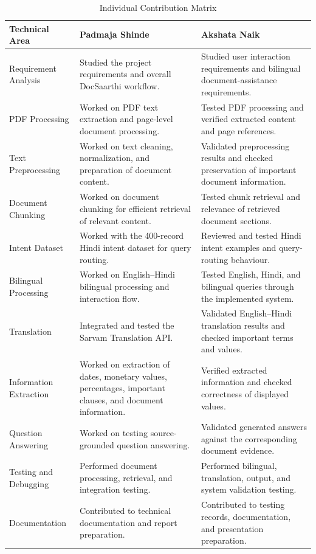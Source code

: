 \begin{table}[H]
\centering
\caption{Individual Contribution Matrix}
\label{tab:individual_contribution}

\small
\renewcommand{\arraystretch}{1.05}
\setlength{\tabcolsep}{4pt}

\begin{tabular}{|
>{\raggedright\arraybackslash}p{3.2cm}|
>{\raggedright\arraybackslash}p{5.1cm}|
>{\raggedright\arraybackslash}p{5.1cm}|}

\hline
\textbf{Technical Area} &
\textbf{Padmaja Shinde} &
\textbf{Akshata Naik}
\\
\hline
Requirement Analysis &
Studied the project requirements and overall
DocSaarthi workflow. &
Studied user interaction requirements and
bilingual document-assistance requirements.
\\
\hline
PDF Processing &
Worked on PDF text extraction and page-level
document processing. &
Tested PDF processing and verified extracted
content and page references.
\\
\hline
Text Preprocessing &
Worked on text cleaning, normalization, and
preparation of document content. &
Validated preprocessing results and checked
preservation of important document information.
\\
\hline
Document Chunking &
Worked on document chunking for efficient
retrieval of relevant content. &
Tested chunk retrieval and relevance of
retrieved document sections.
\\
\hline
Intent Dataset &
Worked with the 400-record Hindi intent dataset
for query routing. &
Reviewed and tested Hindi intent examples and
query-routing behaviour.
\\
\hline
Bilingual Processing &
Worked on English--Hindi bilingual processing
and interaction flow. &
Tested English, Hindi, and bilingual queries
through the implemented system.
\\
\hline
Translation &
Integrated and tested the Sarvam Translation API. &
Validated English--Hindi translation results and
checked important terms and values.
\\
\hline
Information Extraction &
Worked on extraction of dates, monetary values,
percentages, important clauses, and document
information. &
Verified extracted information and checked
correctness of displayed values.
\\
\hline
Question Answering &
Worked on testing source-grounded question
answering. &
Validated generated answers against the
corresponding document evidence.
\\
\hline
Testing and Debugging &
Performed document processing, retrieval, and
integration testing. &
Performed bilingual, translation, output, and
system validation testing.
\\
\hline
Documentation &
Contributed to technical documentation and
report preparation. &
Contributed to testing records, documentation,
and presentation preparation.
\\
\hline
\end{tabular}
\end{table}

